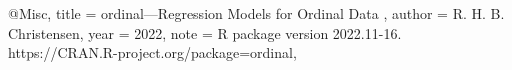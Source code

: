   @Misc{,
    title = {ordinal---Regression Models for Ordinal Data },
    author = {R. H. B. Christensen},
    year = {2022},
    note = {R package version 2022.11-16.
      https://CRAN.R-project.org/package=ordinal},
  }